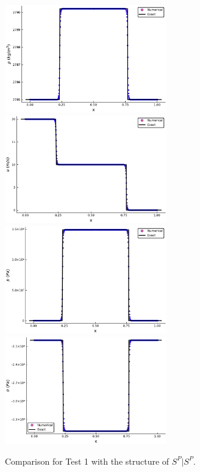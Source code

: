 \documentclass[review]{elsarticle}
\numberwithin{equation}{section}
\numberwithin{table}{section}
\begin{document}
\begin{figure}[ht]
  \centering

\includegraphics[width= 7cm] {case1rho.pdf}
\includegraphics[width= 7cm] {case1u.pdf}
\includegraphics[width= 7cm] {case1p.pdf}
\includegraphics[width= 7cm] {case1sigma.pdf}

    \caption{Comparison for Test 1 with the structure of $S^P|S^P$.  }
  \label{fig:case1}
\end{figure}
\end{document}
